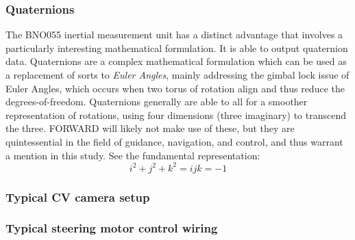 \subsubsection{Quaternions}
\noindent The BNO055 inertial measurement unit has a distinct advantage that involves a particularly interesting mathematical formulation. It is able to output quaternion data. Quaternions are a complex mathematical formulation which can be used as a replacement of sorts to \textit{Euler Angles}, mainly addressing the gimbal lock issue of Euler Angles, which occurs when two torus of rotation align and thus reduce the degrees-of-freedom. Quaternions generally are able to all for a smoother representation of rotations, using four dimensions (three imaginary) to transcend the three. \cite{quat} FORWARD will likely not make use of these, but they are quintessential in the field of guidance, navigation, and control, and thus warrant a mention in this study. See the fundamental representation:\\
$$i^2+j^2+k^2=ijk=-1$$

\subsubsection{Typical CV camera setup}

\subsubsection{Typical steering motor control wiring}